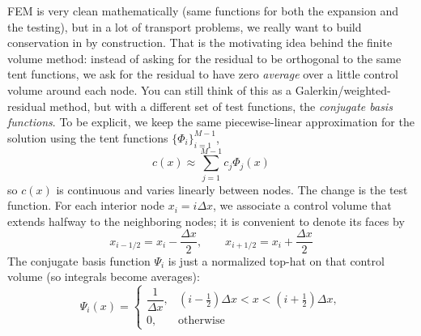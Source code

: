 FEM is very clean mathematically (same functions for both the expansion and the testing), but in a lot of transport problems, we really want to build conservation in by construction. That is the motivating idea behind the finite volume method: instead of asking for the residual to be orthogonal to the same tent functions, we ask for the residual to have zero \emph{average} over a little control volume around each node. You can still think of this as a Galerkin/weighted-residual method, but with a different set of test functions, the \textit{conjugate basis functions}. To be explicit, we keep the same piecewise-linear approximation for the solution using the tent functions $\{\Phi_i\}_{i=1}^{M-1}$,
\begin{equation}
    c(x) \approx \sum_{j=1}^{M-1} c_j \Phi_j(x)
\end{equation}
so $c(x)$ is continuous and varies linearly between nodes. The change is the test function. For each interior node $x_i=i\Delta x$, we associate a control volume that extends halfway to the neighboring nodes; it is convenient to denote its faces by
\begin{equation}
    x_{i-1/2} = x_i - \frac{\Delta x}{2},
    \qquad
    x_{i+1/2} = x_i + \frac{\Delta x}{2}
\end{equation}
The conjugate basis function $\Psi_i$ is just a normalized top-hat on that control volume (so integrals become averages):
\begin{equation}
    \Psi_i(x) =
    \begin{cases}
        \dfrac{1}{\Delta x}, & (i-\tfrac{1}{2})\Delta x < x < (i+\tfrac{1}{2})\Delta x,\\[10pt]
        0, & \text{otherwise}
    \end{cases}
\end{equation}

